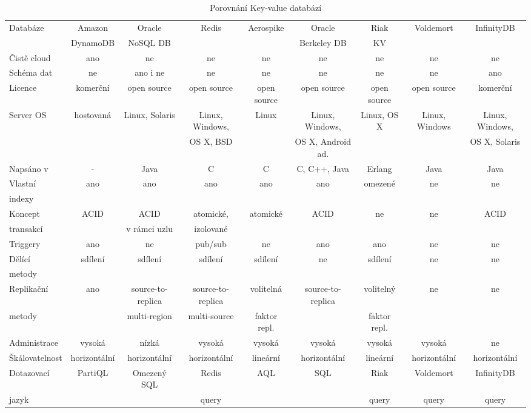 \documentclass[czech,master,dept460,male,csharp,cpdeclaration]{diploma}
\begin{document}
	\begin{table}
		\centering
		\scalebox{0.8}
		{
			\begin{tabular}{ l|c c c c c c c c } 
				\toprule
				Databáze & Amazon & Oracle & Redis & Aerospike & Oracle & Riak & Voldemort & InfinityDB \\
				& DynamoDB & NoSQL DB & & & Berkeley DB & KV & & \\
				\midrule
				Čistě cloud & ano & ne & ne & ne & ne & ne & ne & ne \\
				Schéma dat & ne & ano i ne & ne & ne & ne & ne & ne & ano \\
				Licence & komerční & open source & open source & open source & open source & open source & open source & komerční \\
				Server OS & hostovaná & Linux, Solaris & Linux, Windows, & Linux & Linux, Windows, & Linux, OS X & Linux, Windows &  Linux, Windows, \\
				& & & OS X, BSD & & OS X, Android ad. & & & OS X, Solaris\\
				Napsáno v & - & Java & C & C & C, C++, Java & Erlang & Java & Java\\
				Vlastní & ano & ano & ano & ano & ano & omezené & ne & ne \\
				indexy & & & & & & & & \\
				Koncept & ACID & ACID & atomické, & atomické & ACID & ne & ne & ACID \\
				transakcí & & v rámci uzlu & izolované & & & & & \\
				Triggery & ano & ne & pub/sub & ne & ano & ano & ne & ne \\
				Dělící & sdílení & sdílení & sdílení & sdílení & ne & sdílení & ne & ne \\ 
				metody \\
				Replikační & ano & source-to-replica & source-to-replica & volitelná & source-to-replica & volitelný & ne & ne \\
				metody & & multi-region & multi-source & faktor repl. & & faktor repl. \\
				Administrace & vysoká & nízká & vysoká & vysoká & vysoká & vysoká & vysoká & ne\\
				Škálovatelnost & horizontální & horizontální & horizontální & lineární & horizontální & lineární & horizontální & horizontální\\
				Dotazovací & PartiQL & Omezený SQL & Redis & AQL & SQL & Riak & Voldemort & InfinityDB \\
				jazyk & & & query & & & query & query & query \\
				\bottomrule
			\end{tabular}}%
			\caption{Porovnání Key-value databází\label{tab_kvdb_compare}}
		
	\end{table}
	
\end{document}
